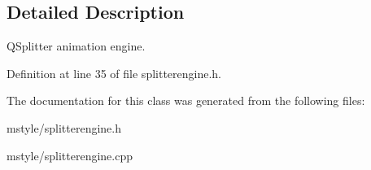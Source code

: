 \subsection{Detailed Description}
Q\+Splitter animation engine. 

Definition at line 35 of file splitterengine.\+h.



The documentation for this class was generated from the following files\+:\begin{DoxyCompactItemize}
\item 
mstyle/splitterengine.\+h\item 
mstyle/splitterengine.\+cpp\end{DoxyCompactItemize}

